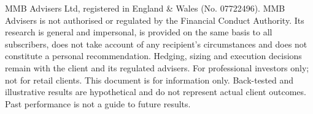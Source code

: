\documentclass[a4paper,11pt]{article}
\begin{document}
\begin{minipage}[t]{0.38\linewidth}
\vspace{0pt}
\end{minipage}

\vspace{0.3cm}
{\tiny\color{footergrey}\sffamily 
MMB Advisers Ltd, registered in England \& Wales (No. 07722496). MMB Advisers is not authorised or regulated by the Financial Conduct Authority. Its research
is general and impersonal, is provided on the same basis to all subscribers, does not take account of any recipient’s circumstances and does not constitute
a personal recommendation. Hedging, sizing and execution decisions remain with the client and its regulated advisers. For professional investors only; not
for retail clients. This document is for information only. Back-tested and illustrative results are hypothetical and do not represent actual client outcomes.
Past performance is not a guide to future results.}
\end{document}
